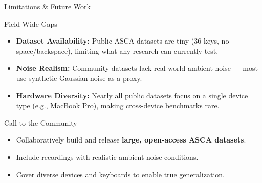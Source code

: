 \documentclass[aspectratio=169]{beamer}
\begin{document}
\begin{frame}{Limitations \& Future Work}
  \begin{block}{Field-Wide Gaps}
    \begin{itemize}
      \item \textbf{Dataset Availability:} Public ASCA datasets are tiny (36 keys, no space/backspace), limiting what any research can currently test.
      \item \textbf{Noise Realism:} Community datasets lack real-world ambient noise — most use synthetic Gaussian noise as a proxy.
      \item \textbf{Hardware Diversity:} Nearly all public datasets focus on a single device type (e.g., MacBook Pro), making cross-device benchmarks rare.
    \end{itemize}
  \end{block}

  \vspace{0.5em}

  \begin{block}{Call to the Community}
    \begin{itemize}
      \item Collaboratively build and release \textbf{large, open-access ASCA datasets}.
      \item Include recordings with realistic ambient noise conditions.
      \item Cover diverse devices and keyboards to enable true generalization.
    \end{itemize}
  \end{block}
\end{frame}

\end{document}
